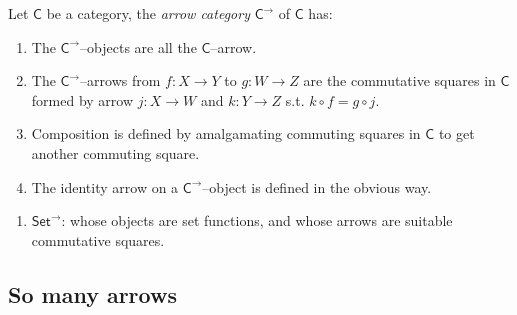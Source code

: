 \begin{df}
	Let $\mathsf{C}$ be a category, 
	the \textit{arrow category}	 {\color{purple} $\mathsf{C}^\to$} of  $\mathsf{C}$ has: 
	\begin{enumerate}[itemsep=5pt,parsep=5pt,leftmargin=3em,topsep=5pt,label=(\arabic*)] %
		\item 
		The $\mathsf{C}^\to$--objects are all the $\mathsf{C}$--arrow.

		\item 
		The $\mathsf{C}^\to$--arrows from $f \colon X \to Y$ to $g \colon W \to Z$ are the commutative squares in $\mathsf{C}$ formed by arrow $j \colon X \to W$ and $k \colon Y \to Z$ s.t. $k \circ f = g \circ j$.

		\begin{center}
		\end{center}

		\item 
		Composition is defined by amalgamating commuting squares in $\mathsf{C}$ to get another commuting square.

		\item 
		The identity arrow on a $\mathsf{C}^\to$--object is defined in the obvious way.
	\end{enumerate}
\end{df}




\begin{example}
	\qquad

	\begin{enumerate}[itemsep=5pt,parsep=5pt,leftmargin=3em,topsep=5pt,label=(\alph*)] 
		\item 
		{\color{purple} $\mathsf{Set}^\to$}: whose objects are set functions, 
		and whose arrows are suitable commutative squares.
	\end{enumerate}
\end{example}






\subsection[So many arrows]{So many arrows}


